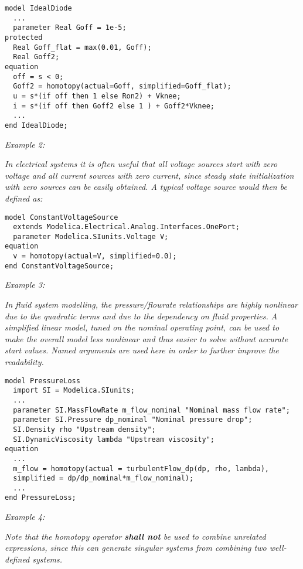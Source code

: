 \begin{lstlisting}[language=modelica]
model IdealDiode
  ...
  parameter Real Goff = 1e-5;
protected
  Real Goff_flat = max(0.01, Goff);
  Real Goff2;
equation
  off = s < 0;
  Goff2 = homotopy(actual=Goff, simplified=Goff_flat);
  u = s*(if off then 1 else Ron2) + Vknee;
  i = s*(if off then Goff2 else 1 ) + Goff2*Vknee;
  ...
end IdealDiode;
\end{lstlisting}

\emph{Example 2:}

\emph{In electrical systems it is often useful that all voltage sources
start with zero voltage and all current sources with zero current, since
steady state initialization with zero sources can be easily obtained. A
typical voltage source would then be defined as:}

\begin{lstlisting}[language=modelica]
model ConstantVoltageSource
  extends Modelica.Electrical.Analog.Interfaces.OnePort; 
  parameter Modelica.SIunits.Voltage V;
equation
  v = homotopy(actual=V, simplified=0.0);
end ConstantVoltageSource;
\end{lstlisting}

\emph{Example 3:}

\emph{In fluid system modelling, the pressure/flowrate relationships are
highly nonlinear due to the quadratic terms and due to the dependency on
fluid properties. A simplified linear model, tuned on the nominal
operating point, can be used to make the overall model less nonlinear
and thus easier to solve without accurate start values. Named arguments
are used here in order to further improve the readability.}

\begin{lstlisting}[language=modelica]
model PressureLoss
  import SI = Modelica.SIunits;
  ...
  parameter SI.MassFlowRate m_flow_nominal "Nominal mass flow rate";
  parameter SI.Pressure dp_nominal "Nominal pressure drop";
  SI.Density rho "Upstream density";
  SI.DynamicViscosity lambda "Upstream viscosity";
equation
  ...
  m_flow = homotopy(actual = turbulentFlow_dp(dp, rho, lambda),
  simplified = dp/dp_nominal*m_flow_nominal);
  ...
end PressureLoss;
\end{lstlisting}

\emph{Example 4:}

\emph{Note that the homotopy operator \textbf{shall not} be used to
combine unrelated expressions, since this can generate singular systems
from combining two well-defined systems.}

